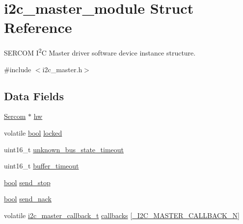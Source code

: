 \hypertarget{structi2c__master__module}{}\section{i2c\+\_\+master\+\_\+module Struct Reference}
\label{structi2c__master__module}


S\+E\+R\+C\+OM I\textsuperscript{2}C Master driver software device instance structure.  




{\ttfamily \#include $<$i2c\+\_\+master.\+h$>$}

\subsection*{Data Fields}
\begin{DoxyCompactItemize}
\item 
\mbox{\hyperlink{union_sercom}{Sercom}} $\ast$ \mbox{\hyperlink{structi2c__master__module_a0c1e47f7408dce5f667a53398c82d13a}{hw}}
\item 
volatile \mbox{\hyperlink{group__group__sam0__utils_ga97a80ca1602ebf2303258971a2c938e2}{bool}} \mbox{\hyperlink{structi2c__master__module_a765892434f9329ded45a5287eeb75957}{locked}}
\item 
uint16\+\_\+t \mbox{\hyperlink{structi2c__master__module_ae1dc34ce71ac470c5f24c79bcd8d48e5}{unknown\+\_\+bus\+\_\+state\+\_\+timeout}}
\item 
uint16\+\_\+t \mbox{\hyperlink{structi2c__master__module_a749c4f56b937e974dba38373c822eb5e}{buffer\+\_\+timeout}}
\item 
\mbox{\hyperlink{group__group__sam0__utils_ga97a80ca1602ebf2303258971a2c938e2}{bool}} \mbox{\hyperlink{structi2c__master__module_a1857be51e54274600320a6dd851f341f}{send\+\_\+stop}}
\item 
\mbox{\hyperlink{group__group__sam0__utils_ga97a80ca1602ebf2303258971a2c938e2}{bool}} \mbox{\hyperlink{structi2c__master__module_a3c279135c200db1548149c965157e0a4}{send\+\_\+nack}}
\item 
volatile \mbox{\hyperlink{group__asfdoc__sam0__sercom__i2c__group_ga0ef653593dbacc01735c61e59ec3f0da}{i2c\+\_\+master\+\_\+callback\+\_\+t}} \mbox{\hyperlink{structi2c__master__module_aa4b70527c8b5136b5cb78a11bee9356e}{callbacks}} \mbox{[}\mbox{\hyperlink{group__asfdoc__sam0__sercom__i2c__group_gga844ac2694772642cfee08a29c50bf054a3563390afb1b1b26a6252e0b5981ed06}{\+\_\+\+I2\+C\+\_\+\+M\+A\+S\+T\+E\+R\+\_\+\+C\+A\+L\+L\+B\+A\+C\+K\+\_\+N}}\mbox{]}
\item 

\end{DoxyCompactItemize}
